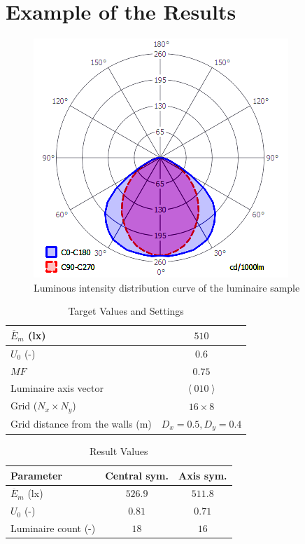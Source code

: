 \section{Example of the Results}

\begin{figure}[htb]
  \centering
  \includegraphics[width=0.7\columnwidth]{IDiag}
  \caption{Luminous intensity distribution curve of the luminaire sample}
  \label{fig:IDiag}
\end{figure}

\begin{table}[htb]
	\renewcommand{\arraystretch}{1.3}
	\caption{Target Values and Settings}
 	\label{tab:trgVal}
	\centering
  \begin{tabular}{| l | c |}
    \hline
    $\overline{E}_{m}$ (lx) & $510$ \\
    \hline
    $U_{0}$ (-) & $0.6$ \\
    \hline
		$MF$ & $0.75$ \\
    \hline
		Luminaire axis vector & $\left\langle 010\right\rangle$ \\
    \hline
		Grid ($N_x \times N_y$) & $16 \times 8$ \\
    \hline
		Grid distance from the walls (m) & $D_x=0.5, D_y=0.4$ \\
    \hline
  \end{tabular}
\end{table}

\begin{table}[htb]
	\renewcommand{\arraystretch}{1.3}
	\caption{Result Values}
 	\label{tab:resValCS}
	\centering
  \begin{tabular}{| l | c | c |}
	  \hline
	  \textbf{Parameter} & \textbf{Central sym.} & \textbf{Axis sym.}\\
    \hline
    $\overline{E}_{m}$ (lx) & $526.9$ & $511.8$ \\
    \hline
    $U_{0}$ (-) & $0.81$ & $0.71$ \\
    \hline
		Luminaire count (-) & $18$ & $16$ \\
    \hline
  \end{tabular}
\end{table}

